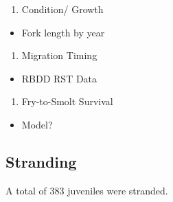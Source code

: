 \documentclass[
]{book}
\providecommand{\tightlist}{%
  \setlength{\itemsep}{0pt}\setlength{\parskip}{0pt}}
\theoremstyle{definition}
\theoremstyle{definition}
\theoremstyle{definition}
\theoremstyle{definition}
\theoremstyle{remark}
\begin{document}
\begin{enumerate}
\def\labelenumi{\arabic{enumi}.}
\setcounter{enumi}{1}
\tightlist
\item
  Condition/ Growth
\end{enumerate}

\begin{itemize}
\tightlist
\item
  Fork length by year
\end{itemize}

\begin{enumerate}
\def\labelenumi{\arabic{enumi}.}
\setcounter{enumi}{2}
\tightlist
\item
  Migration Timing
\end{enumerate}

\begin{itemize}
\tightlist
\item
  RBDD RST Data
\end{itemize}

\begin{enumerate}
\def\labelenumi{\arabic{enumi}.}
\setcounter{enumi}{3}
\tightlist
\item
  Fry-to-Smolt Survival
\end{enumerate}

\begin{itemize}
\tightlist
\item
  Model?
\end{itemize}

\hypertarget{stranding}{%
\subsection{Stranding}\label{stranding}}

A total of 383 juveniles were stranded.
\end{document}
